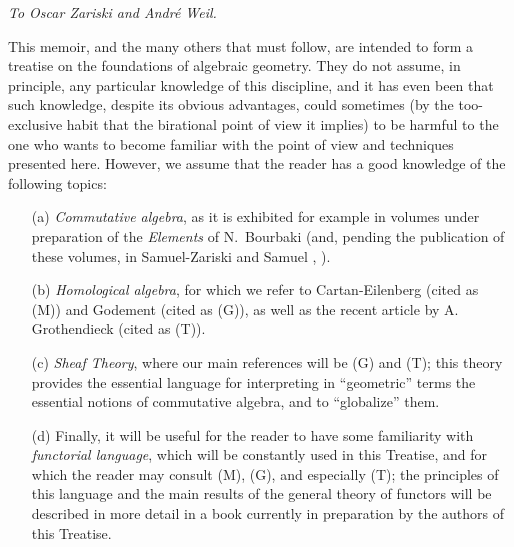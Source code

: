 
\label{intro-section}

\begin{flushright}
\emph{To Oscar Zariski and Andr\'e Weil.}
\end{flushright}
\medskip

This memoir, and the many others that must follow, are intended to
form a treatise on the foundations of algebraic geometry. They do not assume, in
principle, any particular knowledge of this discipline, and it has even been
that such knowledge, despite its obvious advantages, could sometimes (by the
too-exclusive habit that the birational point of view it implies) to be harmful
to the one who wants to become familiar with the point of view and techniques
presented here. However, we assume that the reader has a good knowledge of the
following topics:
\begin{itemize}
  \item[(a)] \emph{Commutative algebra}, as it is exhibited for example in
             volumes under preparation of the \emph{Elements} of N.~Bourbaki
             (and, pending the publication of these volumes, in Samuel-Zariski
             \cite{13} and Samuel \cite{11}, \cite{12}).
  \item[(b)] \emph{Homological algebra}, for which we refer to Cartan-Eilenberg
             \cite{2} (cited as (M)) and Godement \cite{4} (cited as (G)), as well
             as the recent article by A. Grothendieck \cite{6} (cited as (T)).
  \item[(c)] \emph{Sheaf Theory}, where our main references will be (G) and (T);
             this theory provides the essential language for interpreting in
             ``geometric'' terms the essential notions of commutative algebra,
             and to ``globalize'' them.
  \item[(d)] Finally, it will be useful for the reader to have some familiarity with
             \emph{functorial language}, which will be constantly used in this Treatise,
             and for which the reader may consult (M), (G), and especially (T); the
             principles of this language and the main results of the general theory of
             functors will be described in more detail in a book currently in preparation
             by the authors of this Treatise.
\end{itemize}

\asttri

